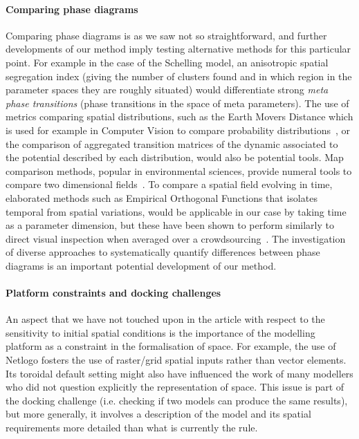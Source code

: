 \documentclass[3p,times,procedia]{elsarticle}
\begin{document}
\paragraph{Comparing phase diagrams} Comparing phase diagrams is as we saw not so straightforward, and further developments of our method imply testing alternative methods for this particular point. For example in the case of the Schelling model, an anisotropic spatial segregation index (giving the number of clusters found and in which region in the parameter spaces they are roughly situated) would differentiate strong \emph{meta phase transitions} (phase transitions in the space of meta parameters). The use of metrics comparing spatial distributions, such as the Earth Movers Distance which is used for example in Computer Vision to compare probability distributions~\citep{rubner2000earth}, or the comparison of aggregated transition matrices of the dynamic associated to the potential described by each distribution, would also be potential tools. Map comparison methods, popular in environmental sciences, provide numeral tools to compare two dimensional fields~\citep{visser2006map}. To compare a spatial field evolving in time, elaborated methods such as Empirical Orthogonal Functions that isolates temporal from spatial variations, would be applicable in our case by taking time as a parameter dimension, but these have been shown to perform similarly to direct visual inspection when averaged over a crowdsourcing~\citep{10.1371/journal.pone.0178165}. The investigation of diverse approaches to systematically quantify differences between phase diagrams is an important potential development of our method.


\paragraph{Platform constraints and docking challenges} An aspect that we have not touched upon in the article with respect to the sensitivity to initial spatial conditions is the importance of the modelling platform as a constraint in the formalisation of space. For example, the use of Netlogo fosters the use of raster/grid spatial inputs rather than vector elements. Its toroidal default setting might also have influenced the work of many modellers who did not question explicitly the representation of space. This issue is part of the docking challenge \citep{Axtelletal1996} (i.e. checking if two models can produce the same results), but more generally, it involves a description of the model and its spatial requirements more detailed than what is currently the rule.
\end{document}
